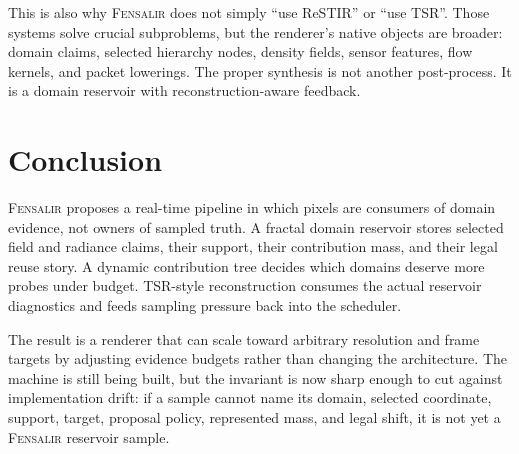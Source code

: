 \documentclass[11pt]{article}
\newcommand{\Fensalir}{\textsc{Fensalir}}
\newcommand{\ReSTIR}{ReSTIR}
\newcommand{\TSR}{TSR}
\begin{document}
This is also why \Fensalir{} does not simply ``use \ReSTIR{}'' or ``use
\TSR{}''.  Those systems solve crucial subproblems, but the renderer's native
objects are broader: domain claims, selected hierarchy nodes, density fields,
sensor features, flow kernels, and packet lowerings.  The proper synthesis is
not another post-process.  It is a domain reservoir with reconstruction-aware
feedback.

\section{Conclusion}

\Fensalir{} proposes a real-time pipeline in which pixels are consumers of
domain evidence, not owners of sampled truth.  A fractal domain reservoir stores
selected field and radiance claims, their support, their contribution mass, and
their legal reuse story.  A dynamic contribution tree decides which domains
deserve more probes under budget.  TSR-style reconstruction consumes the actual
reservoir diagnostics and feeds sampling pressure back into the scheduler.

The result is a renderer that can scale toward arbitrary resolution and frame
targets by adjusting evidence budgets rather than changing the architecture.
The machine is still being built, but the invariant is now sharp enough to cut
against implementation drift: if a sample cannot name its domain, selected
coordinate, support, target, proposal policy, represented mass, and legal
shift, it is not yet a \Fensalir{} reservoir sample.
\end{document}
